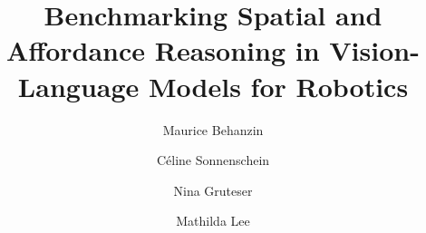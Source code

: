 \documentclass[10pt,twocolumn,letterpaper]{article}
\title{Benchmarking Spatial and Affordance Reasoning in Vision-Language Models for Robotics}
\author{Maurice Behanzin \and Céline Sonnenschein \and Nina Gruteser \and Mathilda Lee}
\begin{document}
\maketitle
    








{
    \small
    
    
}
\end{document}
